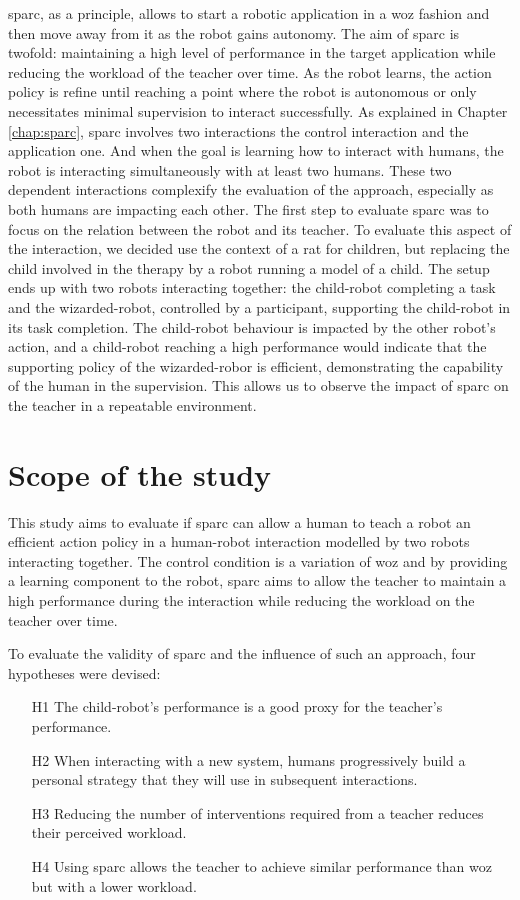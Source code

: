 \gls{sparc}, as a principle, allows to start a robotic application in a \gls{woz} fashion and then move away from it as the robot gains autonomy. The aim of \gls{sparc} is twofold: maintaining a high level of performance in the target application while reducing the workload of the teacher over time. As the robot learns, the action policy is refine until reaching a point where the robot is autonomous or only necessitates minimal supervision to interact successfully. As explained in Chapter \ref{chap:sparc}, \gls{sparc} involves two interactions the control interaction and the application one. And when the goal is learning how to interact with humans, the robot is interacting simultaneously with at least two humans. These two dependent interactions complexify the evaluation of the approach, especially as both humans are impacting each other. The first step to evaluate \gls{sparc} was to focus on the relation between the robot and its teacher. To evaluate this aspect of the interaction, we decided use the context of a \gls{rat} for children, but replacing the child involved in the therapy by a robot running a model of a child. The setup ends up with two robots interacting together: the child-robot completing a task and the wizarded-robot, controlled by a participant, supporting the child-robot in its task completion. The child-robot behaviour is impacted by the other robot's action, and a child-robot reaching a high performance would indicate that the supporting policy of the wizarded-robor is efficient, demonstrating the capability of the human in the supervision. This allows us to observe the impact of \gls{sparc} on the teacher in a repeatable environment. 

\section{Scope of the study}

This study aims to evaluate if \gls{sparc} can allow a human to teach a robot an efficient action policy in a human-robot interaction modelled by two robots interacting together. The control condition is a variation of \gls{woz} and by providing a learning component to the robot, \gls{sparc} aims to allow the teacher to maintain a high performance during the interaction while reducing the workload on the teacher over time.

To evaluate the validity of \gls{sparc} and the influence of such an approach, four hypotheses were devised:
\begin{enumerate}
	\item [H1] The child-robot's performance is a good proxy for the teacher's performance.
	\item [H2] When interacting with a new system, humans progressively build a personal strategy that they will use in subsequent interactions.
	\item [H3] Reducing the number of interventions required from a teacher reduces their perceived workload.
	\item [H4] Using \gls{sparc} allows the teacher to achieve similar performance than \gls{woz} but with a lower workload.
\end{enumerate}

